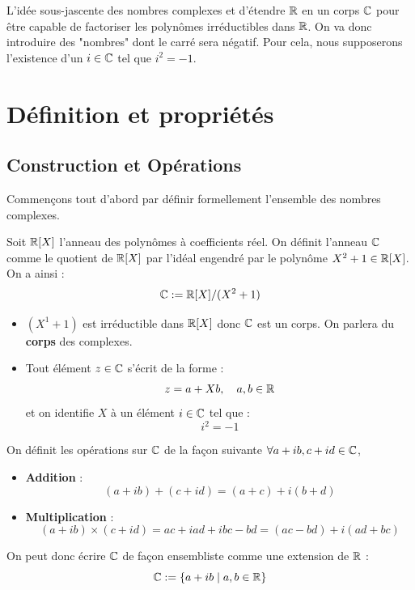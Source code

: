 
L'idée sous-jascente des nombres complexes et d'étendre $\mathbb{R}$ en un corps $\mathbb{C}$ pour être capable de factoriser les polynômes 
irréductibles dans $\mathbb{R}$. On va donc introduire des "nombres" dont le carré sera négatif. 
Pour cela, nous supposerons l'existence d'un $i \in \mathbb{C}$ tel que $i^2 = -1$. 

\minitoc  %


\section{Définition et propriétés}

\subsection{Construction et Opérations}

Commençons tout d'abord par définir formellement l'ensemble des nombres complexes. 

\begin{definition}
    Soit $\mathbb{R}[X]$ l'anneau des polynômes à coefficients réel. On définit l'anneau $\mathbb{C}$ comme le quotient de $\mathbb{R}[X]$ par 
    l'idéal engendré par le polynôme $ X^2+1 \in \mathbb{R}[X]$. On a ainsi : 
        \[ \mathbb{C} := \mathbb{R}[X] / (X^2+1) \] 
    \begin{itemize}
        \item $(X^1 + 1)$ est irréductible dans $\mathbb{R}[X]$ donc $\mathbb{C}$ est un corps. 
        On parlera du \textbf{corps} des complexes. 
        \item Tout élément $z \in \mathbb{C}$ s'écrit de la forme : 
            \[ z = a + Xb, \quad a,b \in \mathbb{R} \] 
        et on identifie $X$ à un élément $ i \in \mathbb{C}$ tel que : 
            \[ i^2 = -1 \] 
    \end{itemize}
    On définit les opérations sur $\mathbb{C}$ de la façon suivante $ \forall a +ib, c+id \in \mathbb{C}$, 
    \begin{itemize}
        \item \textbf{Addition} : 
            \[ (a + ib) + (c + id) = (a+c) + i(b+d) \] 
        \item \textbf{Multiplication} : 
            \[ (a + ib) \times (c + id) = ac + iad + ibc - bd = (ac - bd) + i(ad + bc) \] 
    \end{itemize} 
    On peut donc écrire $\mathbb{C}$ de façon ensembliste comme une extension de $\mathbb{R}$ : 
        \[ \mathbb{C} := \{a + ib \; | \; a,b \in \mathbb{R}\} \] 
\end{definition}

